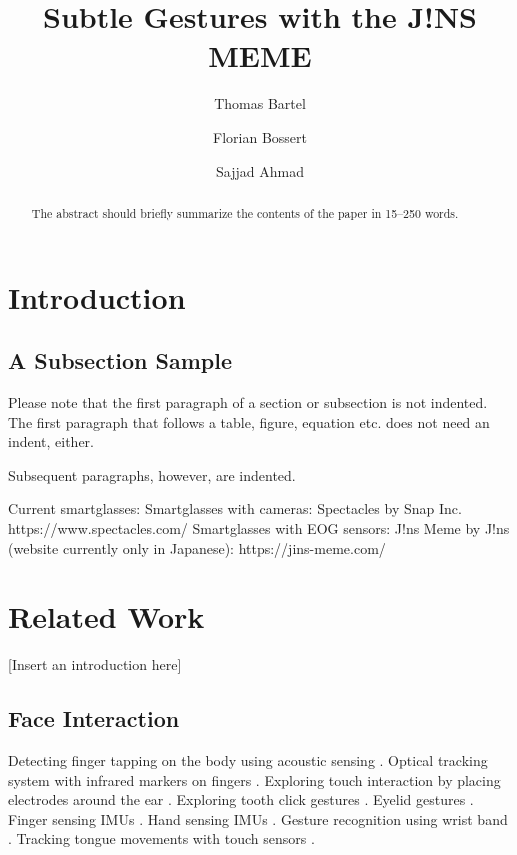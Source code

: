 \documentclass[runningheads]{llncs}
\begin{document}
%
\title{Subtle Gestures with the J!NS MEME}
%
%
\author{Thomas Bartel \and
Florian Bossert \and
Sajjad Ahmad}
%
%
%
\maketitle              %
%
\begin{abstract}
The abstract should briefly summarize the contents of the paper in
15--250 words.

\end{abstract}
%
%
%
\section{Introduction}
\subsection{A Subsection Sample}
Please note that the first paragraph of a section or subsection is
not indented. The first paragraph that follows a table, figure,
equation etc. does not need an indent, either.

Subsequent paragraphs, however, are indented.

Current smartglasses:
Smartglasses with cameras: Spectacles by Snap Inc. https://www.spectacles.com/
Smartglasses with EOG sensors: J!ns Meme by J!ns (website currently only in Japanese): https://jins-meme.com/

\section{Related Work}
[Insert an introduction here]

\subsection{Face Interaction}
Detecting finger tapping on the body using acoustic sensing \cite{10.1145/1753326.1753394}.
Optical tracking system with infrared markers on fingers \cite{10.1145/2556288.2556984}.
Exploring touch interaction by placing electrodes around the ear \cite{10.1145/2468356.2468592}.
Exploring tooth click gestures \cite{10.1145/2935334.2935389}.
Eyelid gestures \cite{10.5555/2788890.2788938}.
Finger sensing IMUs \cite{10.1145/2858036.2858466}.
Hand sensing IMUs \cite{10.1145/2984511.2984582}.
Gesture recognition using wrist band \cite{10.1145/3274783.3274854}.
Tracking tongue movements with touch sensors \cite{10.1145/3311823.3311831}.
\end{document}
